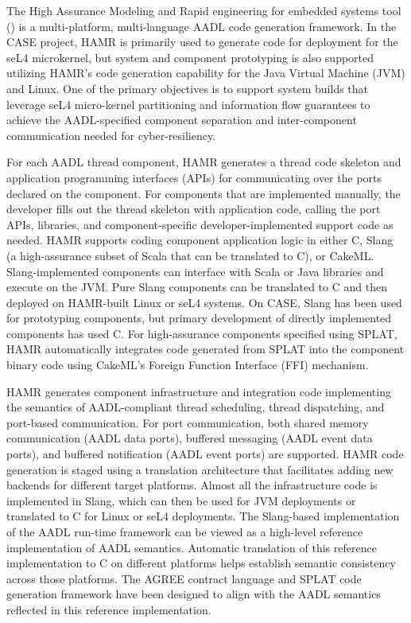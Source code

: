 
The High Assurance Modeling and
Rapid engineering for embedded systems tool (\hamr)
\cite{hamr} is a multi-platform, multi-language
AADL code generation framework.  In the CASE project, HAMR is primarily used
to generate code for deployment for the seL4 microkernel, but system and component
prototyping is also supported utilizing HAMR's code generation capability
for the Java Virtual Machine (JVM) and Linux.  One of the
primary objectives is to support system builds that
leverage seL4 micro-kernel partitioning and information flow
guarantees to achieve the AADL-specified component separation and
inter-component communication needed for cyber-resiliency.

For each AADL thread component, HAMR generates a thread code
skeleton and application programming interfaces (APIs) for communicating over the ports declared on
the component.  For components that are implemented manually, the
developer fills out the thread skeleton with application code,
calling the port APIs, libraries, and component-specific
developer-implemented support code as needed.
HAMR supports coding component application logic in either C,
Slang~\cite{slang} (a high-assurance subset of Scala that can be translated to
C), or CakeML.  Slang-implemented components can interface with
Scala or Java libraries and execute on the JVM.  Pure Slang
components can be translated to C and then deployed on HAMR-built
Linux or seL4 systems.  On CASE, Slang has been used for prototyping
components, but primary development of directly implemented
components has used C.  For high-assurance components specified
using SPLAT, HAMR automatically integrates code generated from
SPLAT into the component binary code using CakeML's Foreign
Function Interface (FFI) mechanism.

HAMR generates component infrastructure and integration code
implementing the semantics of AADL-compliant thread scheduling,
thread dispatching, and port-based communication.
For port communication, both shared memory communication (AADL
data ports), buffered messaging (AADL event data ports), and
buffered notification (AADL event ports) are supported.
HAMR code generation is staged using a translation architecture
that facilitates adding new backends for different target
platforms.   Almost all the infrastructure code is implemented
in Slang, which can then be used for JVM deployments or
translated to C for Linux or seL4 deployments.
The Slang-based implementation of the AADL run-time framework
can be viewed as a high-level reference implementation of AADL
semantics.   Automatic translation of this reference
implementation to C on different platforms helps establish
semantic consistency across those platforms. 
The AGREE contract language and SPLAT
code generation framework have been designed to align with the AADL
semantics reflected in this reference implementation.  

